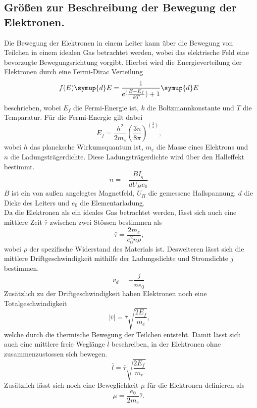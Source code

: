 \subsection{Größen zur Beschreibung der Bewegung der Elektronen.}

\noindent Die Bewegung der Elektronen in einem Leiter kann über die Bewegung von Teilchen in einem idealen Gas betrachtet
werden, wobei das elektrische Feld eine bevorzugte Bewegungsrichtung vorgibt. Hierbei wird die Energieverteilung
der Elektronen durch eine Fermi-Dirac Verteilung
    \begin{equation}
         f(E)\symup{d}E=\frac{1}{e^(\frac{E-E_f}{kT})+1}\symup{d}E
         \label{eqn:fermidirac}
    \end{equation}   
\noindent beschrieben, wobei $E_f$ die Fermi-Energie ist, $k$ die Boltzmannkonstante und $T$ die Temparatur. Für die 
Fermi-Energie gilt dabei
\begin{equation}
    E_f=\frac{h^2}{2m_e}(\frac{3n}{8\pi})^(\frac{2}{3}) \text{,}
    \label{eqn:fermienergie}
\end{equation}
\noindent wobei $h$ das plancksche Wirkumsquantum ist, $m_e$ die Masse eines Elektrons und $n$ die Ladungsträgerdichte.
Diese Ladungsträgerdichte wird über den Halleffekt bestimmt.
\begin{equation}
    n=-\frac{BI_q}{dU_He_0}
    \label{eqn:ladungsdichte}
\end{equation}
\noindent $B$ ist ein von außen angelegtes Magnetfeld, $U_H$ die gemessene Hallspannung, $d$ die Dicke des Leiters und $e_0$
die Elementarladung.\\
\noindent Da die Elektronen als ein ideales Gas betrachtet werden, lässt sich auch eine mittlere Zeit $\bar{\tau}$ 
zwischen zwei Stössen bestimmen als
\begin{equation}
    \bar{\tau}=\frac{2m_e}{e_0^2n\rho}\text{,}
    \label{eqn:mittlere Flugdauer}
\end{equation}
\noindent wobei $\rho$ der spezifische Widerstand des Materials ist. 
Desweiteren lässt sich die mittlere Driftgeschwindigkeit mithilfe der Ladungsdichte und Stromdichte $j$ bestimmen.
\begin{equation}
    \bar{v}_d=-\frac{j}{ne_0}
    \label{eqn:drift}
\end{equation}
Zusätzlich zu der Driftgeschwindigkeit haben Elektronen noch eine Totalgeschwindigkeit
\begin{equation}
    |\bar{v}|=\bar{\tau}\sqrt{\frac{2E_f}{m_e}}\text{,} 
    \label{eqn:total}
\end{equation}
welche durch die thermische Bewegung der Teilchen entsteht. Damit lässt sich auch eine mittlere freie Weglänge $\bar{l}$
beschreiben, in der Elektronen ohne zusammenzustossen sich bewegen.
\begin{equation}
    \bar{l}=\bar{\tau}\sqrt{\frac{2E_f}{m_e}}
    \label{eqn:Weglänge}
\end{equation}
Zusätzlich lässt sich noch eine Beweglichkeit $\mu$ für die Elektronen definieren als
\begin{equation}
    \mu=\frac{e_0}{2m_e}\bar{\tau}\text{.}
    \label{eqn:Beweglichkeit}
\end{equation}

